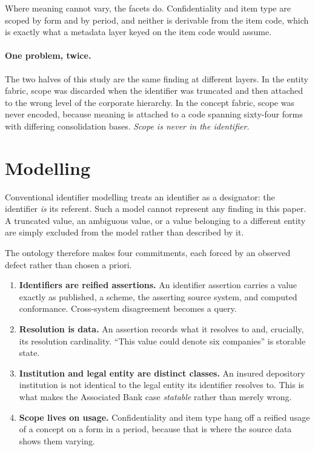\documentclass[11pt]{article}
\begin{document}
Where meaning cannot vary, the facets do. Confidentiality and item type are scoped by form and by period, and neither is derivable from the item code, which is exactly what a metadata layer keyed on the item code would assume.

\paragraph{One problem, twice.} The two halves of this study are the same finding at different layers. In the entity fabric, scope was discarded when the identifier was truncated and then attached to the wrong level of the corporate hierarchy. In the concept fabric, scope was never encoded, because meaning is attached to a code spanning sixty-four forms with differing consolidation bases. \emph{Scope is never in the identifier.}

\section{Modelling}
\label{sec:model}

Conventional identifier modelling treats an identifier as a designator: the identifier \emph{is} its referent. Such a model cannot represent any finding in this paper. A truncated value, an ambiguous value, or a value belonging to a different entity are simply excluded from the model rather than described by it.

The ontology therefore makes four commitments, each forced by an observed defect rather than chosen a priori.

\begin{enumerate}
  \item \textbf{Identifiers are reified assertions.} An identifier assertion carries a value exactly as published, a scheme, the asserting source system, and computed conformance. Cross-system disagreement becomes a query.
  \item \textbf{Resolution is data.} An assertion records what it resolves to and, crucially, its resolution cardinality. ``This value could denote six companies'' is storable state.
  \item \textbf{Institution and legal entity are distinct classes.} An insured depository institution is not identical to the legal entity its identifier resolves to. This is what makes the Associated Bank case \emph{statable} rather than merely wrong.
  \item \textbf{Scope lives on usage.} Confidentiality and item type hang off a reified usage of a concept on a form in a period, because that is where the source data shows them varying.
\end{enumerate}
\end{document}
